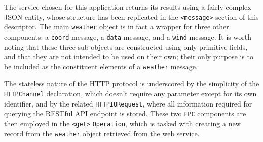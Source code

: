 The service chosen for this application returns its results using a fairly
complex JSON entity, whose structure has been replicated in the
\lstinline!<message>! section of this descriptor. The main \texttt{weather}
object is in fact a wrapper for three other components: a \texttt{coord}
message, a \texttt{data} message, and a \texttt{wind} message. It is worth
noting that these three sub-objects are constructed using only primitive
fields, and that they are not intended to be used on their own; their only
purpose is to be included as the constituent elements of a \texttt{weather}
message.

The stateless nature of the HTTP protocol is underscored by the simplicity of
the \texttt{HTTPChannel} declaration, which doesn't require any parameter
except for its own identifier, and by the related \texttt{HTTPIORequest}, where
all information required for querying the RESTful API endpoint is stored. These
two \texttt{FPC} components are then employed in the \lstinline!<get>!
\texttt{Operation}, which is tasked with creating a new record from the
\texttt{weather} object retrieved from the web service. 

